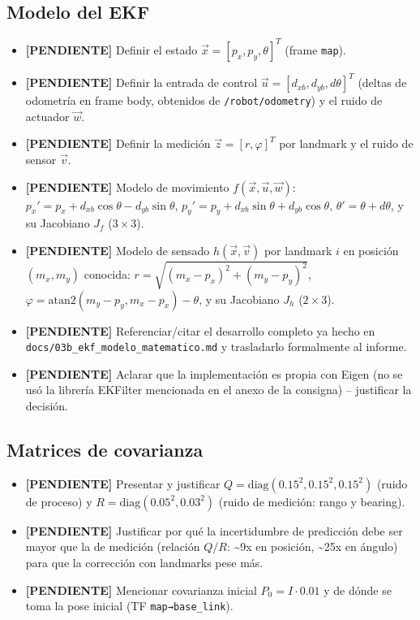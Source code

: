 \documentclass[11pt,a4paper]{article}
\newcommand{\TODO}[1]{\textcolor{todocolor}{\textbf{[PENDIENTE]} #1}}
\newenvironment{tareas}{\begin{itemize}\setlength{\itemsep}{2pt}}{\end{itemize}}
\begin{document}
\subsection{Modelo del EKF}
\begin{tareas}
    \item \TODO{Definir el estado $\vec{x} = [p_x, p_y, \theta]^T$ (frame \texttt{map}).}
    \item \TODO{Definir la entrada de control $\vec{u} = [d_{xb}, d_{yb}, d\theta]^T$ (deltas de odometría en frame body, obtenidos de \texttt{/robot/odometry}) y el ruido de actuador $\vec{w}$.}
    \item \TODO{Definir la medición $\vec{z} = [r, \varphi]^T$ por landmark y el ruido de sensor $\vec{v}$.}
    \item \TODO{Modelo de movimiento $f(\vec{x},\vec{u},\vec{w})$: $p_x' = p_x + d_{xb}\cos\theta - d_{yb}\sin\theta$, $p_y' = p_y + d_{xb}\sin\theta + d_{yb}\cos\theta$, $\theta' = \theta + d\theta$, y su Jacobiano $J_f$ ($3\times3$).}
    \item \TODO{Modelo de sensado $h(\vec{x},\vec{v})$ por landmark $i$ en posición $(m_x,m_y)$ conocida: $r = \sqrt{(m_x-p_x)^2+(m_y-p_y)^2}$, $\varphi = \mathrm{atan2}(m_y-p_y, m_x-p_x) - \theta$, y su Jacobiano $J_h$ ($2\times3$).}
    \item \TODO{Referenciar/citar el desarrollo completo ya hecho en \texttt{docs/03b\_ekf\_modelo\_matematico.md} y trasladarlo formalmente al informe.}
    \item \TODO{Aclarar que la implementación es propia con Eigen (no se usó la librería EKFilter mencionada en el anexo de la consigna) -- justificar la decisión.}
\end{tareas}

\subsection{Matrices de covarianza}
\begin{tareas}
    \item \TODO{Presentar y justificar $Q = \mathrm{diag}(0.15^2, 0.15^2, 0.15^2)$ (ruido de proceso) y $R = \mathrm{diag}(0.05^2, 0.03^2)$ (ruido de medición: rango y bearing).}
    \item \TODO{Justificar por qué la incertidumbre de predicción debe ser mayor que la de medición (relación $Q/R$: \textasciitilde9x en posición, \textasciitilde25x en ángulo) para que la corrección con landmarks pese más.}
    \item \TODO{Mencionar covarianza inicial $P_0 = I \cdot 0.01$ y de dónde se toma la pose inicial (TF \texttt{map→base\_link}).}
\end{tareas}
\end{document}
